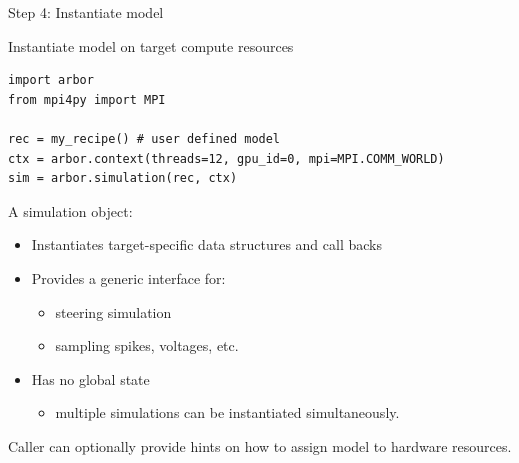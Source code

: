 \documentclass[aspectratio=43]{beamer}
\begin{document}
\begin{frame}[fragile]{Step 4: Instantiate model}
    \begin{code}{Instantiate model on target compute resources}
        \begin{lstlisting}[style=talkpython]
import arbor
from mpi4py import MPI

rec = my_recipe() # user defined model
ctx = arbor.context(threads=12, gpu_id=0, mpi=MPI.COMM_WORLD)
sim = arbor.simulation(rec, ctx)
        \end{lstlisting}
    \end{code}

    A simulation object:
    \begin{itemize}
        \item Instantiates target-specific data structures and call backs
        \item Provides a generic interface for:
        \begin{itemize}
            \item steering simulation
            \item sampling spikes, voltages, etc.
        \end{itemize}
        \item Has no global state
        \begin{itemize}
            \item multiple simulations can be instantiated simultaneously.
        \end{itemize}
    \end{itemize}

    Caller can optionally provide hints on how to assign model to hardware resources.
\end{frame}

\end{document}
